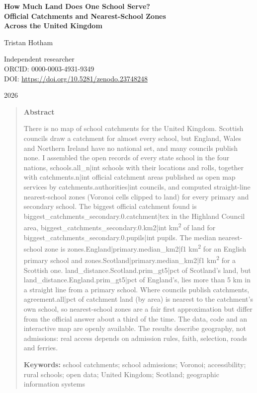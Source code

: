 \documentclass[11pt,a4paper]{article}
\begin{document}
\begin{center}
{\Large\bfseries How Much Land Does One School Serve?\\[2pt] Official Catchments and Nearest-School Zones\\[2pt] Across the United Kingdom\par}
\vspace{1.2em}
{\large Tristan Hotham\par}
\vspace{0.3em}
{\small Independent researcher\\
ORCID: 0000-0003-4931-9349\\
DOI: \href{https://doi.org/10.5281/zenodo.23748248}{https://doi.org/10.5281/zenodo.23748248}\par}
\vspace{0.8em}
2026
\end{center}

\begin{quote}
\small
\begin{center}\textbf{Abstract}\end{center}
There is no map of school catchments for the United Kingdom. Scottish councils draw a catchment for almost every school, but England, Wales and Northern Ireland have no national set, and many councils publish none. I assembled the open records of every state school in the four nations, {{schools.all_n|int}} schools with their locations and rolls, together with {{catchments.n|int}} official catchment areas published as open map services by {{catchments.authorities|int}} councils, and computed straight-line nearest-school zones (Voronoi cells clipped to land) for every primary and secondary school. The biggest official catchment found is {{biggest_catchments_secondary.0.catchment|tex}} in the Highland Council area, {{biggest_catchments_secondary.0.km2|int}} km\textsuperscript{2} of land for {{biggest_catchments_secondary.0.pupils|int}} pupils. The median nearest-school zone is {{zones.England|primary.median_km2|f1}} km\textsuperscript{2} for an English primary school and {{zones.Scotland|primary.median_km2|f1}} km\textsuperscript{2} for a Scottish one. {{land_distance.Scotland.prim_gt5|pct}} of Scotland's land, but {{land_distance.England.prim_gt5|pct}} of England's, lies more than 5 km in a straight line from a primary school. Where councils publish catchments, {{agreement.all|pct}} of catchment land (by area) is nearest to the catchment's own school, so nearest-school zones are a fair first approximation but differ from the official answer about a third of the time. The data, code and an interactive map are openly available. The results describe geography, not admissions: real access depends on admission rules, faith, selection, roads and ferries.

\textbf{Keywords:} school catchments; school admissions; Voronoi; accessibility; rural schools; open data; United Kingdom; Scotland; geographic information systems
\end{quote}
\end{document}
